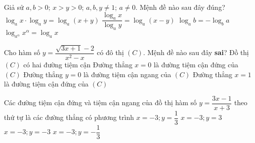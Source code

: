 \begin{ex}%
	Giả sử $a, b > 0$; $x > y > 0$; $a, b, y \neq 1$; $a \neq 0$. Mệnh đề nào sau đây đúng?
	\choice
	{$\log_ax \cdot \log_ay = \log_a \left(x + y \right)$}
	{$\dfrac{\log_ax}{\log_ay} = \log_a \left(x - y \right)$}
	{$\log_ab = - \log_ba$}
	{\True $\log_{a^ \alpha}{x^ \alpha} = \log_ax$}
\end{ex}
\begin{ex}%
	Cho hàm số $ y = \dfrac{\sqrt{3x + 1} - 2}{x^2 - x}$ có đô thị $(C)$. Mệnh đề nào sau đây \textbf{sai}?
	\choice
	{Đồ thị $(C)$ có hai đường tiệm cận}
	{Đường thẳng $x = 0$ là đường tiệm cận đứng của $(C)$}
	{Đường thẳng $y = 0$ là đường tiệm cận ngang của $(C)$}
	{\True Đường thẳng $x = 1$ là đường tiệm cận đứng của $(C)$}
\end{ex}
\begin{ex}%
	Các đường tiệm cận đứng và tiệm cận ngang của đồ thị hàm số $y = \dfrac{3x - 1}{x + 3}$ theo thứ tự là các đường thẳng có phương trình
	\choice
	{$x = -3; y = \dfrac{1}{3}$}
	{\True $x = -3; y = 3$}
	{$x = -3; y = -3$}
	{$ x = -3; y = - \dfrac{1}{3}$}
\end{ex}
